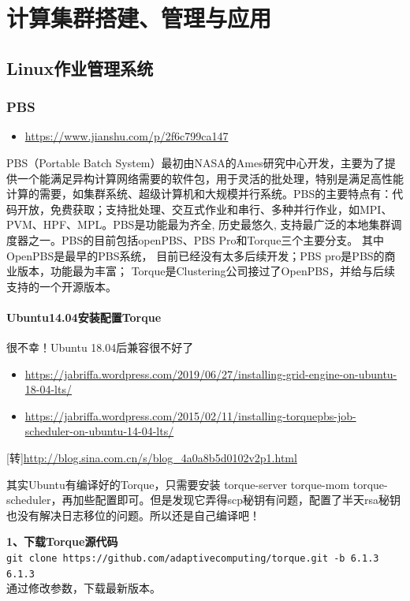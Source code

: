 {\part{计算集群搭建、管理与应用}
\chapter{Linux作业管理系统}
\section{PBS}
\begin{itemize}
\item \url{https://www.jianshu.com/p/2f6c799ca147}
\end{itemize}


PBS（Portable Batch System）最初由NASA的Ames研究中心开发，主要为了提供一个能满足异构计算网络需要的软件包，用于灵活的批处理，特别是满足高性能计算的需要，如集群系统、超级计算机和大规模并行系统。PBS的主要特点有：代码开放，免费获取；支持批处理、交互式作业和串行、多种并行作业，如MPI、PVM、HPF、MPL。PBS是功能最为齐全, 历史最悠久, 支持最广泛的本地集群调度器之一。PBS的目前包括openPBS、PBS Pro和Torque三个主要分支。 其中OpenPBS是最早的PBS系统， 目前已经没有太多后续开发；PBS pro是PBS的商业版本，功能最为丰富； Torque是Clustering公司接过了OpenPBS，并给与后续支持的一个开源版本。


\subsection{Ubuntu14.04安装配置Torque}
{\color{red} 很不幸！Ubuntu 18.04后兼容很不好了}
\begin{itemize}
\item \url{https://jabriffa.wordpress.com/2019/06/27/installing-grid-engine-on-ubuntu-18-04-lts/}
\item \url{https://jabriffa.wordpress.com/2015/02/11/installing-torquepbs-job-scheduler-on-ubuntu-14-04-lts/}
\end{itemize}


[转]\url{http://blog.sina.com.cn/s/blog_4a0a8b5d0102v2p1.html}

其实Ubuntu有编译好的Torque，只需要安装 torque-server torque-mom torque-scheduler，再加些配置即可。但是发现它弄得scp秘钥有问题，配置了半天rsa秘钥也没有解决日志移位的问题。所以还是自己编译吧！

\textbf{1、下载Torque源代码}\\
\verb|git clone https://github.com/adaptivecomputing/torque.git -b 6.1.3 6.1.3|\\
通过修改参数，下载最新版本。

}
